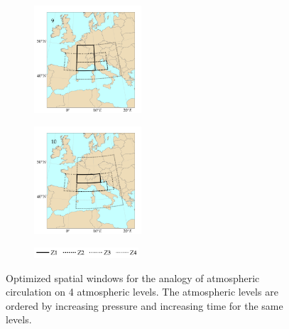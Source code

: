 \documentclass[twocol]{ametsoc}
\begin{document}
\begin{figure}[htb]
\begin{subfigure}{.5\columnwidth}
		\centering
		\includegraphics[width=4cm]{figures/spatial_win_z4/Spatial_windows_9.png}
	\end{subfigure}%
	\begin{subfigure}{.5\columnwidth}
		\centering
		\includegraphics[width=4cm]{figures/spatial_win_z4/Spatial_windows_10.png}
	\end{subfigure}
	\begin{subfigure}{.5\columnwidth}
		\centering
		\includegraphics[width=3.9cm]{figures/spatial_win_z4/legend.png}
	\end{subfigure}
	\caption{Optimized spatial windows for the analogy of atmospheric circulation on 4 atmospheric levels. The atmospheric levels are ordered by increasing pressure and increasing time for the same levels.}
	\label{fig:spatial_windows_z4}
\end{figure}
\end{document}
